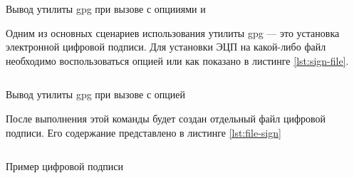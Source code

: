 \begin{listing}[H]
    \inputminted[lastline=14]{console}{resources/03_export_certificate}
    \caption{Вывод утилиты gpg при вызове с опцииями  и }
    \label{lst:export-certificate}
\end{listing}

Одним из основных сценариев использования утилиты gpg --- это установка электронной цифровой подписи. Для установки ЭЦП на какой-либо
файл необходимо воспользоваться опцией  или  как показано в листинге \ref{lst:sign-file}.

\begin{listing}[H]
    \inputminted{console}{resources/04_sign_file}
    \caption{Вывод утилиты gpg при вызове с опцией }
    \label{lst:sign-file}
\end{listing}

После выполнения этой команды будет создан отдельный файл цифровой подписи. Его содержание представлено в листинге \ref{lst:file-sign}

\begin{listing}[H]
    \inputminted{console}{resources/05_file_sign}
    \caption{Пример цифровой подписи}
    \label{lst:file-sign}
\end{listing}